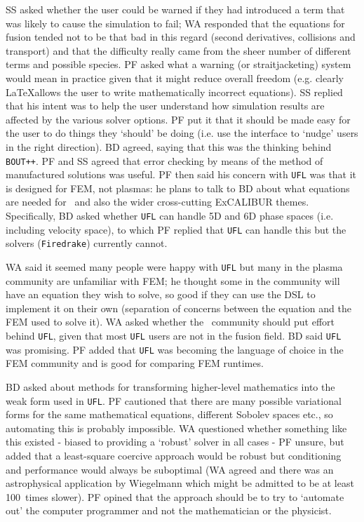 \documentclass[11pt]{article}
\begin{document}
SS asked whether the user could be warned if they had introduced a term that 
was likely to cause the simulation to fail; WA responded that the equations for 
fusion tended not to be that bad in this regard (second derivatives, 
collisions and transport) and that the difficulty really came from the sheer 
number of different terms and possible species.  PF asked what a warning (or 
straitjacketing) system would mean in practice given that it might reduce 
overall freedom (e.g. clearly \LaTeX allows the user to write 
mathematically incorrect equations).  SS replied that his intent was to help 
the user understand how simulation results are affected by the various solver 
options.  PF put it that it should be made easy for the user to do things they 
`should' be doing (i.e. use the interface to `nudge' users in the right 
direction).  BD agreed, saying that this was the thinking behind {\tt BOUT++}.  
PF and SS agreed that error checking by means of the method of manufactured 
solutions was useful.  PF then said his concern with {\tt UFL} was that it is 
designed for FEM, not plasmas: he plans to talk to BD about what equations are 
needed for \nep\  and also the wider cross-cutting ExCALIBUR themes.  
Specifically, BD asked whether {\tt UFL} can handle 5D and 6D phase spaces 
(i.e. including velocity space), to which PF replied that {\tt UFL} can handle 
this but the solvers ({\tt Firedrake}) currently cannot.

WA said it seemed many people were happy with {\tt UFL} but many in the plasma 
community are unfamiliar with FEM; he thought some in the community will have 
an equation they wish to solve, so good if they can use the DSL to implement it 
on their own (separation of concerns between the equation and the FEM used to 
solve it).  WA asked whether the \nep\  community should put effort behind 
{\tt UFL}, given that most {\tt UFL} users are not in the fusion field.  BD 
said {\tt UFL} was promising.  PF added that {\tt UFL} was becoming the 
language of choice in the FEM community and is good for comparing FEM runtimes.

BD asked about methods for transforming higher-level mathematics into the weak 
form used in {\tt UFL}.  PF cautioned that there are many possible variational 
forms for the same mathematical equations, different Sobolev spaces etc., so 
automating this is probably impossible.  WA questioned whether something like 
this existed - biased to providing a `robust' solver in all cases - PF unsure, 
but added that a least-square coercive approach would be robust but 
conditioning and performance would always be suboptimal (WA agreed and there 
was an astrophysical application by Wiegelmann which might be admitted
to be at least 100~times slower).  PF opined 
that the approach should be to try to `automate out' the computer programmer 
and not the mathematician or the physicist.
\end{document}
